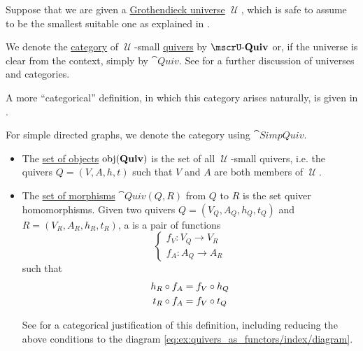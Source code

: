 \begin{definition}\label{def:category_of_small_quivers}
  Suppose that we are given a \hyperref[def:grothendieck_universe]{Grothendieck universe} \( \mscrU \), which is safe to assume to be the smallest suitable one as explained in .

  We denote the \hyperref[def:category]{category} of \( \mscrU \)-small \hyperref[def:hypergraph]{quivers} by \( \ucat{Quiv} \) or, if the universe is clear from the context, simply by \( \cat{Quiv} \). See  for a further discussion of universes and categories.

  A more \enquote{categorical} definition, in which this category arises naturally, is given in .

  For simple directed graphs, we denote the category using \( \cat{SimpQuiv} \).

  \begin{itemize}
    \item The \hyperref[def:category/objects]{set of objects} \( \operatorname{obj}(\operatorname{\mathbf{Quiv}}) \) is the set of all \( \mscrU \)-small quivers, i.e. the quivers \( Q = (V, A, h, t) \) such that \( V \) and \( A \) are both members of \( \mscrU \).

    \item The \hyperref[def:category/morphisms]{set of morphisms} \( \cat{Quiv}(Q, R) \) from \( Q \) to \( R \) is the set quiver homomorphisms. Given two quivers \( Q = (V_Q, A_Q, h_Q, t_Q) \) and \( R = (V_R, A_R, h_R, t_R) \), a  is a pair of functions
    \begin{equation}\label{eq:def:category_of_small_quivers/homomorphism}
      \begin{cases}
        f_V: V_Q \to V_R \\
        f_A: A_Q \to A_R
      \end{cases}
    \end{equation}
    such that
    \begin{align}
      h_R \bincirc f_A &= f_V \bincirc h_Q \label{eq:def:category_of_small_quivers/homomorphism/head} \\
      t_R \bincirc f_A &= f_V \bincirc t_Q \label{eq:def:category_of_small_quivers/homomorphism/tail}
    \end{align}

    See  for a categorical justification of this definition, including reducing the above conditions to the diagram \eqref{eq:ex:quivers_as_functors/index/diagram}.


\end{itemize}
\end{definition}
